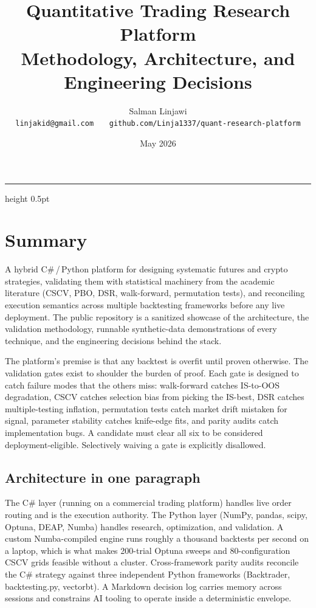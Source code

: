 \documentclass[10pt,letterpaper]{article}
\title{\vspace{-3em}\sffamily\bfseries Quantitative Trading Research Platform\\[0.2em]
       \large\mdseries\color{accent} Methodology, Architecture, and Engineering Decisions}
\author{\sffamily Salman Linjawi\\
        \small \texttt{linjakid@gmail.com} \, \, \, \texttt{github.com/Linja1337/quant-research-platform}}
\date{\sffamily\small May 2026}
\begin{document}
\maketitle
\vspace{-1.5em}
{\color{rule}\hrule height 0.5pt}
\vspace{0.5em}

\section{Summary}

A hybrid C\#\,/\,Python platform for designing systematic futures and crypto strategies, validating them with statistical machinery from the academic literature (CSCV, PBO, DSR, walk-forward, permutation tests), and reconciling execution semantics across multiple backtesting frameworks before any live deployment. The public repository is a sanitized showcase of the architecture, the validation methodology, runnable synthetic-data demonstrations of every technique, and the engineering decisions behind the stack.

The platform's premise is that any backtest is overfit until proven otherwise. The validation gates exist to shoulder the burden of proof. Each gate is designed to catch failure modes that the others miss: walk-forward catches IS-to-OOS degradation, CSCV catches selection bias from picking the IS-best, DSR catches multiple-testing inflation, permutation tests catch market drift mistaken for signal, parameter stability catches knife-edge fits, and parity audits catch implementation bugs. A candidate must clear all six to be considered deployment-eligible. Selectively waiving a gate is explicitly disallowed.

\subsection{Architecture in one paragraph}

The C\# layer (running on a commercial trading platform) handles live order routing and is the execution authority. The Python layer (NumPy, pandas, scipy, Optuna, DEAP, Numba) handles research, optimization, and validation. A custom Numba-compiled engine runs roughly a thousand backtests per second on a laptop, which is what makes 200-trial Optuna sweeps and 80-configuration CSCV grids feasible without a cluster. Cross-framework parity audits reconcile the C\# strategy against three independent Python frameworks (Backtrader, backtesting.py, vectorbt). A Markdown decision log carries memory across sessions and constrains AI tooling to operate inside a deterministic envelope.
\end{document}

